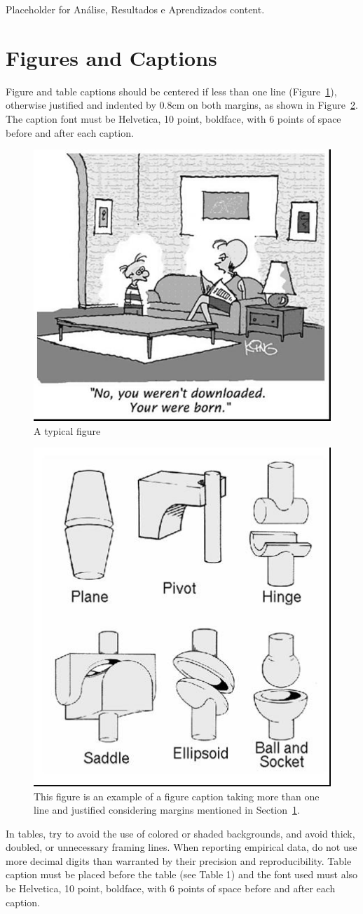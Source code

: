 \documentclass[12pt]{article}
\begin{document}
Placeholder for Análise, Resultados e Aprendizados content.

\section{Figures and Captions}\label{sec:figs}


Figure and table captions should be centered if less than one line
(Figure~\ref{fig:exampleFig1}), otherwise justified and indented by 0.8cm on
both margins, as shown in Figure~\ref{fig:exampleFig2}. The caption font must
be Helvetica, 10 point, boldface, with 6 points of space before and after each
caption.

\begin{figure}[ht]
\centering
\includegraphics[width=.5\textwidth]{fig1.jpg}
\caption{A typical figure}
\label{fig:exampleFig1}
\end{figure}

\begin{figure}[ht]
\centering
\includegraphics[width=.3\textwidth]{fig2.jpg}
\caption{This figure is an example of a figure caption taking more than one
  line and justified considering margins mentioned in Section~\ref{sec:figs}.}
\label{fig:exampleFig2}
\end{figure}

In tables, try to avoid the use of colored or shaded backgrounds, and avoid
thick, doubled, or unnecessary framing lines. When reporting empirical data,
do not use more decimal digits than warranted by their precision and
reproducibility. Table caption must be placed before the table (see Table 1)
and the font used must also be Helvetica, 10 point, boldface, with 6 points of
space before and after each caption.
\end{document}
